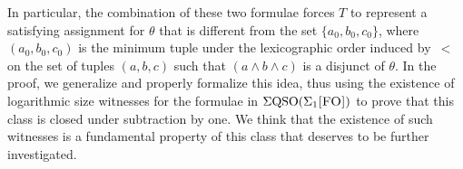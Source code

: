 In particular, the combination of these two formulae forces $T$ to represent a satisfying assignment for $\theta$ that is different from the set $\{a_0,b_0,c_0\}$, where $(a_0,b_0,c_0)$ is the minimum tuple under the lexicographic order induced by~$<$ on the set of tuples $(a,b,c)$ such that $(a \wedge b \wedge c)$ is a disjunct of $\theta$. In the proof, we generalize and properly formalize this idea, thus using the existence of logarithmic size witnesses for the formulae in $\Sigma{\rm QSO}(\Sigma_{1}\textsc{[FO]})$ to prove that this class is closed under subtraction by one. We think that the existence of such witnesses is a fundamental property of this class that deserves to be further investigated. 

